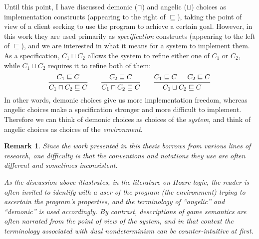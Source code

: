 \documentclass[11pt,oneside]{book}
\newtheorem{remark}[theorem]{Remark}
\theoremstyle{definition}
\begin{document}
Until this point,
I have discussed demonic ($\sqcap$) and angelic ($\sqcup$) choices
as implementation constructs
(appearing to the right of $\sqsubseteq$),
taking the point of view of a client
seeking to use the program to achieve a certain goal.
However,
in this work they are used primarily
as \emph{specification} constructs
(appearing to the left of $\sqsubseteq$),
and we are interested in what it means
for a system to implement them.
%
As a specification, $C_1 \sqcap C_2$
allows the system to refine either one of $C_1$ or $C_2$, while
$C_1 \sqcup C_2$ requires it to refine
both of them:
\[
  \begin{prooftree}
    \hypo{C_1 \sqsubseteq C}
    \infer1{C_1 \sqcap C_2 \sqsubseteq C}
  \end{prooftree}
  \qquad
  \begin{prooftree}
    \hypo{C_2 \sqsubseteq C}
    \infer1{C_1 \sqcap C_2 \sqsubseteq C}
  \end{prooftree}
  \qquad
  \begin{prooftree}
    \hypo{C_1 \sqsubseteq C}
    \hypo{C_2 \sqsubseteq C}
    \infer2{C_1 \sqcup C_2 \sqsubseteq C}
  \end{prooftree}
\]
In other words,
demonic choices
give us more
implementation freedom,
whereas angelic choices make a specification
stronger and more difficult to implement.
Therefore we can think of demonic choices as
choices of the \emph{system}, %
and think of angelic choices as
choices of the \emph{environment}.

\begin{remark}
Since
the work presented in this thesis
borrows from various lines of research,
one difficulty is that
the conventions and notations they use
are often different and sometimes inconsistent.

As the discussion above illustrates,
in the literature on Hoare logic,
the reader is often invited to identify with
a \emph{user} of the program (the environment)
trying to ascertain the program's properties,
and the terminology of ``angelic'' and ``demonic''
is used accordingly.
By contrast,
descriptions of game semantics are often narrated
from the point of view of the \emph{system},
and in that context the terminology
associated with dual nondeterminism
can be counter-intuitive at first.
\end{remark}
\end{document}
